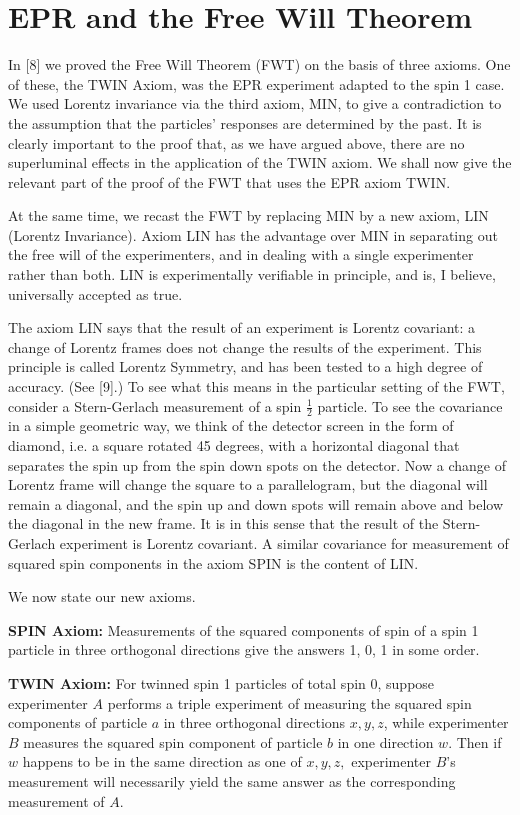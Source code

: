\documentclass[12pt]{article}
\begin{document}
\section{EPR and the Free Will Theorem}
In [8] we proved the Free Will Theorem (FWT) on the basis of three axioms. One of these, the TWIN Axiom, was the EPR experiment adapted to the spin 1 case. We used Lorentz invariance via the third axiom, MIN, to give a contradiction to the assumption that the particles’ responses are determined by the past. It is clearly important to the proof that, as we have argued above, there are no superluminal effects in the application of the TWIN axiom. We shall now give the relevant part of the proof of the FWT that uses the EPR axiom TWIN.

At the same time, we recast the FWT by replacing MIN by a new axiom, LIN (Lorentz Invariance). Axiom LIN has the advantage over MIN in separating out the free will of the experimenters, and in dealing with a single experimenter rather than both. LIN is experimentally verifiable in principle, and is, I believe, universally accepted as true.

The axiom LIN says that the result of an experiment is Lorentz covariant: a change of Lorentz frames does not change the results of the experiment. This principle is called Lorentz Symmetry, and has been tested to a high degree of accuracy. (See [9].) To see what this means in the particular setting of the FWT, consider a Stern-Gerlach measurement of a spin $\frac{1}{2}$ particle. To see the covariance in a simple geometric way, we think of the detector screen in the form of diamond, i.e. a square rotated 45 degrees, with a horizontal diagonal that separates the spin up from the spin down spots on the detector. Now a change of Lorentz frame will change the square to a parallelogram, but the diagonal will remain a diagonal, and the spin up and down spots will remain above and below the diagonal in the new frame. It is in this sense that the result of the Stern-Gerlach experiment is Lorentz covariant. A similar covariance for measurement of squared spin components in the axiom SPIN is the content of LIN.

We now state our new axioms.

{\bf SPIN Axiom:} Measurements of the squared components of spin of a spin 1 particle in three orthogonal directions give the answers 1, 0, 1 in some order.

{\bf TWIN Axiom:} For twinned spin 1 particles of total spin $0$, suppose experimenter $A$ performs a triple experiment of measuring the squared spin components of particle $a$ in three orthogonal directions $x, y, z$, while experimenter $B$ measures the squared spin component of particle $b$ in one direction $w$. Then if $w$ happens to be in the same direction as one of $x, y, z,$ experimenter $B$'s measurement will necessarily yield the same answer as the corresponding measurement of $A$.
\end{document}
